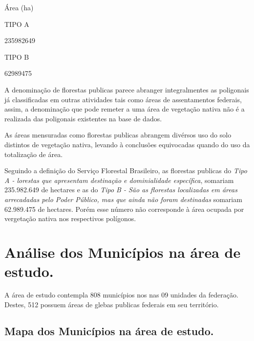 \documentclass[
  letterpaper,
]{report}
\begin{document}
Área (ha)

\n    

\n  

\n  

\n    

\n      

TIPO A

\n      

235982649

\n    

\n    

\n      

TIPO B

\n      

62989475

\n    

\n  

\n

A denominação de florestas publicas parece abranger integralmentes as
poligonais já classificadas em outras atividades tais como áreas de
assentamentos federais, assim, a denominação que pode remeter a uma área
de vegetação nativa não é a realizada das poligonais existentes na base
de dados.

As áreas mensuradas como florestas publicas abrangem divérsos uso do
solo distintos de vegetação nativa, levando à conclusões equivocadas
quando do uso da totalização de área.

Seguindo a definição do Serviço Florestal Brasileiro, as florestas
publicas do \emph{Tipo A - lorestas que apresentam destinação e
dominialidade específica}, somariam 235.982.649 de hectares e as do
\emph{Tipo B - São as florestas localizadas em áreas arrecadadas pelo
Poder Público, mas que ainda não foram destinadas} somariam 62.989.475
de hectares. Porém esse número não corresponde à área ocupada por
vergetação nativa nos respectivos polígonos.


\hypertarget{anuxe1lise-dos-municuxedpios-na-uxe1rea-de-estudo.}{%
\chapter{Análise dos Municípios na área de
estudo.}\label{anuxe1lise-dos-municuxedpios-na-uxe1rea-de-estudo.}}

A área de estudo contempla 808 municípios nos nas 09 unidades da
federação. Destes, 512 possuem áreas de glebas publicas federais em seu
território.

\hypertarget{mapa-dos-municuxedpios-na-uxe1rea-de-estudo.}{%
\section{Mapa dos Municípios na área de
estudo.}\label{mapa-dos-municuxedpios-na-uxe1rea-de-estudo.}}
\end{document}
